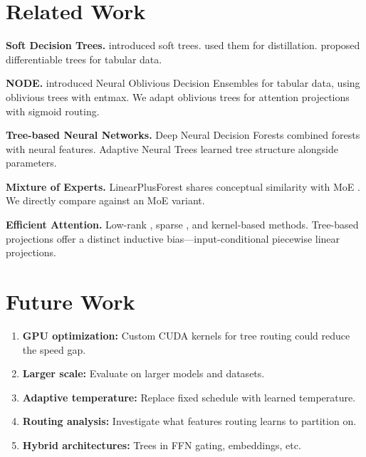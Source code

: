 \documentclass[11pt,a4paper]{article}
\begin{document}
\section{Related Work}

\textbf{Soft Decision Trees.} \citet{irsoy2012soft} introduced soft trees. \citet{frosst2017distilling} used them for distillation. \citet{hazimeh2020tree} proposed differentiable trees for tabular data.

\textbf{NODE.} \citet{popov2020neural} introduced Neural Oblivious Decision Ensembles for tabular data, using oblivious trees with entmax. We adapt oblivious trees for attention projections with sigmoid routing.

\textbf{Tree-based Neural Networks.} Deep Neural Decision Forests \citep{kontschieder2015deep} combined forests with neural features. Adaptive Neural Trees \citep{tanno2019adaptive} learned tree structure alongside parameters.

\textbf{Mixture of Experts.} LinearPlusForest shares conceptual similarity with MoE \citep{shazeer2017outrageously}. We directly compare against an MoE variant.

\textbf{Efficient Attention.} Low-rank \citep{wang2020linformer}, sparse \citep{child2019generating}, and kernel-based \citep{katharopoulos2020transformers} methods. Tree-based projections offer a distinct inductive bias---input-conditional piecewise linear projections.

\section{Future Work}

\begin{enumerate}
    \item \textbf{GPU optimization:} Custom CUDA kernels for tree routing could reduce the speed gap.
    \item \textbf{Larger scale:} Evaluate on larger models and datasets.
    \item \textbf{Adaptive temperature:} Replace fixed schedule with learned temperature.
    \item \textbf{Routing analysis:} Investigate what features routing learns to partition on.
    \item \textbf{Hybrid architectures:} Trees in FFN gating, embeddings, etc.
\end{enumerate}
\end{document}
